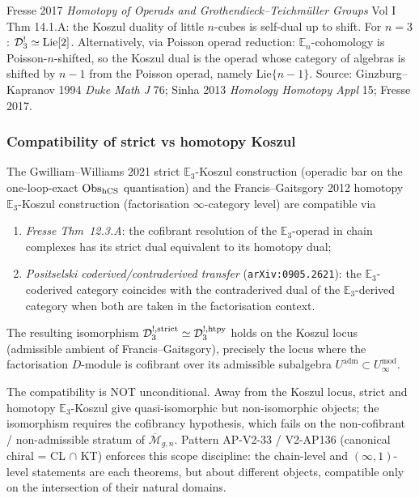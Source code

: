 \begin{proof-sketch}
Fresse 2017 \emph{Homotopy of Operads and Grothendieck--Teichmüller
Groups} Vol I Thm 14.1.A: the Koszul duality of little $n$-cubes is
self-dual up to shift. For $n = 3$: $\mathcal{D}_3^! \simeq \mathrm{Lie}[2]$.
Alternatively, via Poisson operad reduction: $\mathbb E_n$-cohomology
is Poisson-$n$-shifted, so the Koszul dual is the operad whose
category of algebras is shifted by $n-1$ from the Poisson operad,
namely Lie$\{n-1\}$. Source: Ginzburg--Kapranov 1994 \emph{Duke Math J}
76; Sinha 2013 \emph{Homology Homotopy Appl} 15; Fresse 2017.
\end{proof-sketch}

\subsubsection{Compatibility of strict vs homotopy Koszul}

\begin{theorem}\ClaimStatusTheorem
\label{opus13:thm:strict-homotopy-koszul}
The Gwilliam--Williams 2021 strict $\mathbb E_3$-Koszul construction
(operadic bar on the one-loop-exact $\mathrm{Obs}_{\mathrm{hCS}}$ quantisation) and the
Francis--Gaitsgory 2012 homotopy $\mathbb E_3$-Koszul construction
(factorisation $\infty$-category level) are compatible via
\begin{enumerate}
\item \emph{Fresse Thm~12.3.A}: the cofibrant resolution of the
  $\mathbb E_3$-operad in chain complexes has its strict dual equivalent
  to its homotopy dual;
\item \emph{Positselski coderived/contraderived transfer}
  (\texttt{arXiv:0905.2621}): the $\mathbb E_3$-coderived category
  coincides with the contraderived dual of the $\mathbb E_3$-derived
  category when both are taken in the factorisation context.
\end{enumerate}
The resulting isomorphism
$\mathcal{D}_3^{!,\mathrm{strict}}\simeq\mathcal{D}_3^{!,\mathrm{htpy}}$ holds on the
Koszul locus (admissible ambient of Francis--Gaitsgory), precisely the
locus where the factorisation $D$-module is cofibrant over its
admissible subalgebra $U^{\mathrm{adm}} \subset U_\infty^{\mathrm{mod}}$.
\end{theorem}

\begin{remark}\ClaimStatusRemark
\label{opus13:rem:koszul-scope}
The compatibility is NOT unconditional. Away from the Koszul locus,
strict and homotopy $\mathbb E_3$-Koszul give quasi-isomorphic but
non-isomorphic objects; the isomorphism requires the cofibrancy
hypothesis, which fails on the non-cofibrant / non-admissible stratum
of $\overline{\mathcal M}_{g,n}$. Pattern AP-V2-33 / V2-AP136 (canonical
chiral = CL $\cap$ KT) enforces this scope discipline: the chain-level
and $(\infty, 1)$-level statements are each theorems, but about
different objects, compatible only on the intersection of their
natural domains.
\end{remark}



